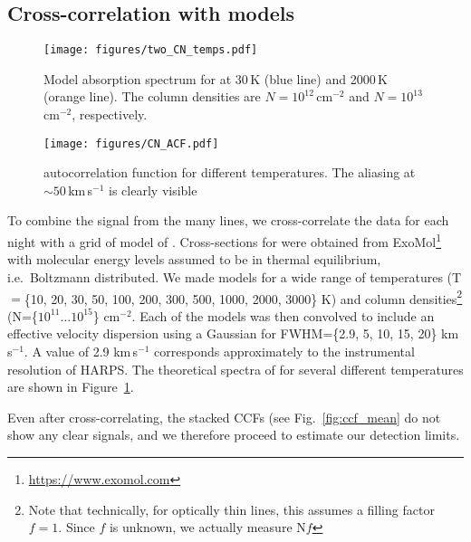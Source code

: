 \documentclass{aa}
\begin{document}
\subsection{Cross-correlation with \texorpdfstring{}{CN} models}\label{sect:CCF}


\begin{figure}
    \begin{centering}
        \texttt{[image: figures/two\_CN\_temps.pdf]}
        \caption{Model absorption spectrum for  at 30\,K (blue line) and 2000\,K (orange line). The  column densities are $N=10^{12}$\,cm$^{-2}$ and $N=10^{13}$\,cm$^{-2}$, respectively. }
        \label{fig:CN_theory}
    \end{centering}
\end{figure}

\begin{figure}
    \begin{centering}
        \texttt{[image: figures/CN\_ACF.pdf]}
        \caption{ autocorrelation function for different temperatures. The aliasing at $\sim50$\,km\,s$^{-1}$ is clearly visible}
        \label{fig:CN_ACF}
    \end{centering}
\end{figure}

To combine the signal from the many  lines, we cross-correlate the data for each night with a grid of model of .
%
Cross-sections for  were obtained from ExoMol\footnote{\url{https://www.exomol.com}} \citep{Tennyson12,Tennyson16,Brooke14} with molecular energy levels assumed to be in thermal equilibrium, i.e.\ Boltzmann distributed.
%
We made models for a wide range of temperatures (T$=$\{10, 20, 30, 50, 100, 200, 300, 500, 1000, 2000, 3000\} K) and column densities\footnote{Note that technically, for optically thin lines, this assumes a filling factor $f=1$.
%
Since $f$ is unknown, we actually measure N$f$} (N=\{$10^{11} \ldots 10^{15}$\} cm$^{-2}$.
%
Each of the models was then convolved to include an effective velocity dispersion using a Gaussian for FWHM=\{2.9, 5, 10, 15, 20\} km\,s$^{-1}$.
%
A value of 2.9 km\,s$^{-1}$ corresponds approximately to the instrumental resolution of HARPS.
%
The theoretical spectra of  for several different temperatures are shown in Figure~\ref{fig:CN_theory}.

Even after cross-correlating, the stacked CCFs (see Fig.~\ref{fig:ccf_mean} do not show any clear signals, and we therefore proceed to estimate our detection limits.
\end{document}
